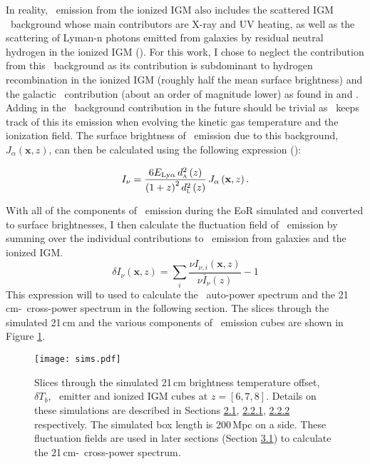 In reality, \lya\ emission from the ionized IGM also includes the scattered IGM \lya\
background whose main contributors are X-ray and UV heating, as well as the scattering of Lyman-n
photons emitted from galaxies by residual neutral hydrogen in the ionized IGM (\cite{2007MNRAS.376.1680P}).
For this work, I chose to neglect the contribution from this \lya\ background as its contribution
is subdominant to hydrogen recombination in the ionized IGM (roughly half the mean surface brightness)
and the galactic \lya\ contribution (about an order of magnitude lower) as found in \cite{2013ApJ...763..132S} and
\cite{2017ApJ...848...52H}. Adding in
the \lya\ background contribution in the future should be
trivial as \fastsim\ keeps track of this its emission when evolving the kinetic
gas temperature and the ionization field. The surface brightness
of \lya\ emission due to this background, $J_{\alpha} \left( \textbf{x}, z\right)$, can then be
calculated using the following expression (\cite{2013ApJ...763..132S}):

\begin{equation}
  I_{\nu} = \frac{6 E_{\text{Ly}\alpha}\, d_\textsc{a}^2 \left(z \right)}{\left( 1 + z\right)^2 d_\textsc{l}^2 \left( z \right)}\, J_{\alpha} \left( \textbf{x}, z \right).
\end{equation}

With all of the components of \lya\ emission during the EoR simulated and converted to surface brightnesses,
I then calculate the fluctuation field of \lya\ emission by summing over the individual
contributions to \lya\ emission from galaxies and the ionized IGM.
\begin{equation}
  \delta I_{\nu} \left(\textbf{x}, z \right) = \sum_i \frac{\nu I_{\nu, i} \left(\textbf{x}, z \right)}{\nu \bar{I}_{\nu} \left(z \right)} - 1
\end{equation}
This expression will to used to calculate the \lya\ auto-power spectrum and the 21\,cm-\lya\
cross-power spectrum in the following section. The slices through the simulated 21\,cm and the various
components of \lya\ emission cubes are shown in Figure \ref{fig:sims}.

\begin{figure}[p]
	\centering
	\texttt{[image: sims.pdf]}
	\caption[Simulated 21cm and \lya\ emission]{Slices through the simulated 21\,cm brightness temperature offset, $\delta T_b$, \lya\ emitter and ionized IGM cubes at $z = \left[6, 7, 8\right]$. Details on these simulations are described in Sections \hyperref[sec:21cm_temp]{2.1}, \hyperref[ref:laes]{2.2.1}, \hyperref[sec:ionized_igm]{2.2.2} respectively. The simulated box length is 200\,Mpc on a side. These fluctuation fields are used in later sections (Section \hyperref[sec:cross-power]{3.1}) to calculate the 21\,cm-\lya\ cross-power spectrum.}
	\label{fig:sims}
\end{figure}
